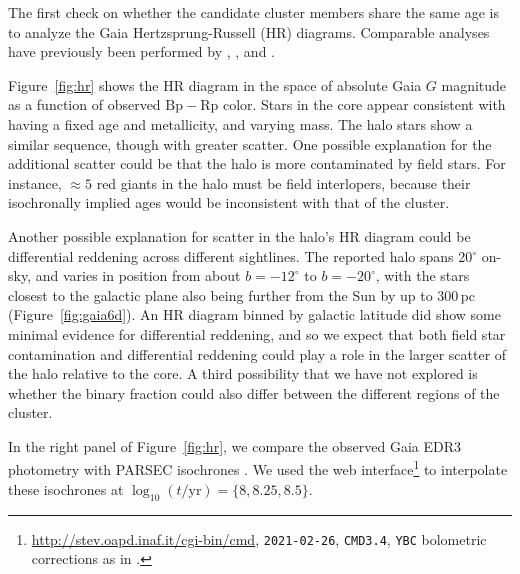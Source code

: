 \documentclass[12pt,twocolumn,tighten]{aastex63}
\begin{document}
The first check on whether the candidate cluster members share the
same age is to analyze the Gaia Hertzsprung-Russell (HR) diagrams.
Comparable analyses have previously been performed by
,
, and .

Figure~\ref{fig:hr} shows the HR diagram in the space of absolute Gaia
$G$ magnitude as a function of observed $\mathrm{Bp}-\mathrm{Rp}$
color.  Stars in the core appear consistent with having a fixed age
and metallicity, and varying mass.  The halo stars show a similar
sequence, though with greater scatter.  One possible explanation for
the additional scatter could be that the halo is more contaminated by
field stars.  For instance, $\approx5$ red giants in the halo must be
field interlopers, because their isochronally implied ages would be
inconsistent with that of the cluster.

Another possible explanation for scatter in the halo's HR diagram
could be differential reddening across different sightlines.  The
reported halo spans 20$^\circ$ on-sky, and varies in position from
about $b=-12^\circ$ to $b=-20^\circ$, with the stars closest to the
galactic plane also being further from the Sun by up to 300\,pc
(Figure~\ref{fig:gaia6d}).  An HR diagram binned by galactic latitude
did show some minimal evidence for differential reddening, and so we
expect that both field star contamination and differential reddening
could play a role in the larger scatter of the halo relative to the
core.  A third possibility that we have not explored is whether the
binary fraction could also differ between the different regions of the
cluster.

In the right panel of Figure~\ref{fig:hr}, we compare the observed
Gaia EDR3 photometry with PARSEC isochrones
\citep{bressan_parsec_2012,chen_improving_2014,chen_parsec_2015,marigo_new_2017}.
We used the web
interface\footnote{\url{http://stev.oapd.inaf.it/cgi-bin/cmd},
\texttt{2021-02-26}, \texttt{CMD3.4}, \texttt{YBC} bolometric
corrections as in \citet{chen_2019_YBC}.} to interpolate these
isochrones at $\log_{10}(t/\mathrm{yr})=\{8, 8.25, 8.5\}$.
\end{document}
